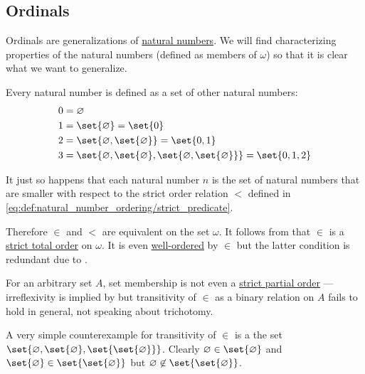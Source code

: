 \subsection{Ordinals}\label{subsec:ordinals}

\begin{remark}\label{rem:ordinal_definition}
  Ordinals are generalizations of \hyperref[def:set_of_natural_numbers]{natural numbers}. We will find characterizing properties of the natural numbers (defined as members of \hyperref[thm:smallest_inductive_set_existence]{\( \omega \)}) so that it is clear what we want to generalize.

  Every natural number is defined as a set of other natural numbers:
  \begin{align*}
    &0 = \varnothing \\
    &1 = \set{ \varnothing } = \set{ 0 } \\
    &2 = \set{ \varnothing, \set{ \varnothing } } = \set{ 0, 1 } \\
    &3 = \set{ \varnothing, \set{ \varnothing }, \set{ \varnothing, \set{ \varnothing } } } = \set{ 0, 1, 2 }
  \end{align*}

  It just so happens that each natural number \( n \) is the set of natural numbers that are smaller with respect to the strict order relation \( < \) defined in \eqref{eq:def:natural_number_ordering/strict_predicate}.

  Therefore \( \in \) and \( < \) are equivalent on the set \( \omega \). It follows from  that \( \in \) is a \hyperref[def:totally_ordered_set]{strict total order} on \( \omega \). It is even \hyperref[def:well_ordered_set]{well-ordered} by \( \in \) but the latter condition is redundant due to .

  For an arbitrary set \( A \), set membership is not even a \hyperref[def:partially_ordered_set/strict]{strict partial order} --- irreflexivity is implied by  but transitivity of \( \in \) as a binary relation on \( A \) fails to hold in general, not speaking about trichotomy.

  A very simple counterexample for transitivity of \( \in \) is a the set \( \set{ \varnothing, \set{ \varnothing }, \set{ \set{ \varnothing } } } \). Clearly \( \varnothing \in \set{ \varnothing } \) and \( \set{ \varnothing } \in \set{ \set{ \varnothing } } \) but \( \varnothing \not\in \set{ \set{ \varnothing } } \).


\end{remark}
